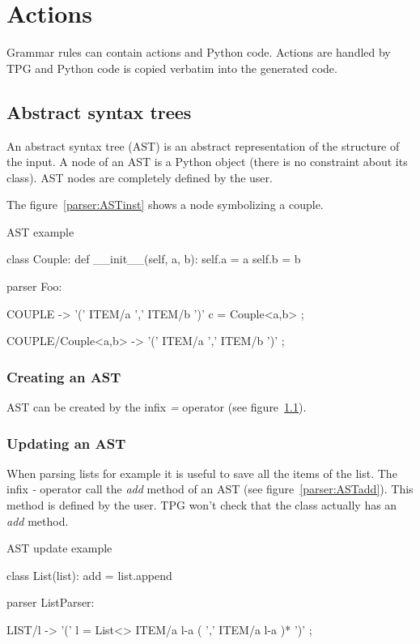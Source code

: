 \section{Actions}

Grammar rules can contain actions and Python code.
Actions are handled by TPG and Python code is copied verbatim into the generated code.

\subsection{Abstract syntax trees}								\label{parser:AST}

An abstract syntax tree (AST) is an abstract representation of the structure of the input.
A node of an AST is a Python object (there is no constraint about its class).
AST nodes are completely defined by the user.

The figure~\ref{parser:ASTinst} shows a node symbolizing a couple.

\begin{code}
\caption{AST example}											\label{parser:ASTinst}
\begin{verbatimtab}[4]
{{
	class Couple:
		def __init__(self, a, b):
			self.a = a
			self.b = b
}}

parser Foo:

	COUPLE -> '(' ITEM/a ',' ITEM/b ')' c = Couple<a,b> ;

	COUPLE/Couple<a,b> -> '(' ITEM/a ',' ITEM/b ')' ;
\end{verbatimtab}
\end{code}

\subsubsection{Creating an AST}

AST can be created by the infix \emph{=} operator (see figure~\ref{parser:AST}).

\subsubsection{Updating an AST}

When parsing lists for example it is useful to save all the items of the list.
The infix \emph{-} operator call the \emph{add} method of an AST (see figure~\ref{parser:ASTadd}).
This method is defined by the user.
TPG won't check that the class actually has an \emph{add} method.

\begin{code}
\caption{AST update example}									\label{parser:ASTadd}
\begin{verbatimtab}[4]
{{
	class List(list):
		add = list.append
}}

parser ListParser:

	LIST/l ->
		'('
			l = List<>
			ITEM/a l-a
			( ',' ITEM/a l-a )*
		')'
		;
\end{verbatimtab}
\end{code}

